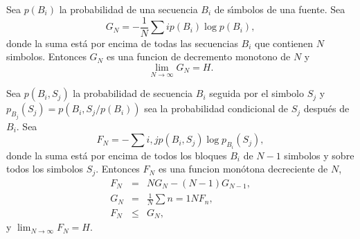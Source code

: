 \begin{theorem}
\label{th:5}
Sea $p(B_{i})$ la probabilidad de una secuencia $B_{i}$ de
s\'{\i}mbolos de una fuente. Sea
\begin{equation}
G_{N} = - \frac{1}{N} \sum{i} p(B_{i}) \log p(B_{i}),
\end{equation}
donde la suma est\'{a} por encima de todas las secuencias $B_{i}$ que
contienen $N$ simbolos. Entonces $G_{N}$ es una funcion de decremento
monotono de $N$ y
\begin{equation}
\lim_{N \rightarrow \infty} G_{N} = H.
\end{equation}
\end{theorem}

\begin{theorem}
\label{th:6}
Sea $p(B_{i},S_{j})$ la probabilidad de secuencia $B_{i}$ seguida por
el simbolo $S_{j}$ y $p_{B_{j}}(S_{j}) = p(B_{i},S_{j}/p(B_{i}))$ sea
la probabilidad condicional de $S_{j}$ despu\'{e}s de $B_{i}$. Sea
\begin{equation}
F_{N} = - \sum{i,j} p(B_{i},S_{j}) \log p_{B_{i}}(S_{j}),
\end{equation}
donde la suma est\'{a} por encima de todos los bloques $B_{i}$ de $N-1$
simbolos y sobre todos los simbolos $S_{j}$. Entonces $F_{N}$ es una
funcion mon\'{o}tona decreciente de $N$,
\begin{equation}
\begin{array}{rcl}
F_{N} &=& NG_{N} - (N - 1)G_{N-1}, \\
G_{N} &=& \frac{1}{N} \sum{n=1}{N} F_{n}, \\
F_{N} &\leq& G_{N},
\end{array}
\end{equation}
y $\lim_{N \rightarrow \infty} F_{N} = H$.  
\end{theorem}

